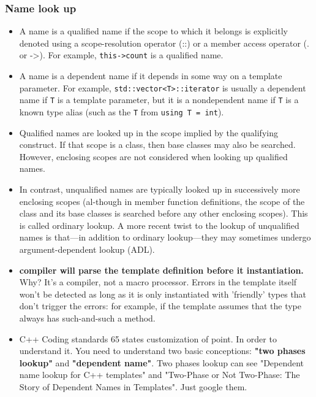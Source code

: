 \documentclass[a4paper,11pt,twoside]{book}
\begin{document}
\subsubsection{Name look up}
\begin{itemize}
    \item A name is a qualified name if the scope to which it belongs is explicitly denoted using a scope-resolution operator (::) or a member access operator (. or ->). For example, \texttt{this->count} is a qualified name.

    \item  A name is a dependent name if it depends in some way on a template parameter.  For example, \texttt{std::vector<T>::iterator} is usually a dependent name if \texttt{T} is a template parameter, but it is a nondependent name if \texttt{T} is a known type alias (such as the \texttt{T} from \texttt{using T = int}).

	\item Qualified names are looked up in the scope implied by the qualifying construct. If that scope is a class, then base classes may also be searched. However, enclosing scopes are not considered when looking up qualified names. 

	\item In contrast, unqualified names are typically looked up in successively more enclosing scopes (al-though in member function definitions, the scope of the class and its base classes is searched before any other enclosing scopes). This is called ordinary lookup. A more recent twist to the lookup of unqualified names is that—in addition to ordinary lookup—they may sometimes undergo argument-dependent lookup (ADL).
            
    \item \textbf{compiler will parse the template definition before it instantiation.} Why? It's a compiler, not a macro processor. Errors in the template itself won't be detected as long as it is only instantiated with 'friendly' types that don't trigger the errors: for example, if the template assumes that the type always has such-and-such a method.

    \item C++ Coding standards 65 states customization of point. In order to understand it. You need to understand two basic conceptions: \textbf{"two phases lookup"} and \textbf{"dependent name"}.  Two phases lookup can see "Dependent name lookup for C++ templates" and "Two-Phase or Not Two-Phase: The Story of Dependent Names in Templates". Just google them.
\end{itemize}
\end{document}
